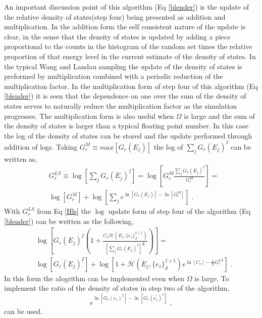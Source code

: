 \documentclass[aps,prl,reprint,superscriptaddress,showkeys]{revtex4-1}
\begin{document}
An important discussion point of this algorithm (Eq \ref{blender}) is the update of the relative density of states(step four) being presented as addition and multiplication. In the addition form the self consistent nature of the update is clear, in the sense that the  density of states is updated by adding a  piece proportional to the counts in the histogram of the random set times the relative proportion of  that energy level in the current estimate of the density of states.  In the typical Wang and Landau sampling the update of the density of states is preformed by multiplication combined with a periodic reduction of the multiplication factor. In the multiplication form of step four of this algorithm (Eq \ref{blender}) it is seen that the dependence on one over the sum of the density of states serves to naturally reduce the multiplication factor as the simulation progresses. The multiplication form is also useful when $\Omega$ is large and the sum of the density of states is larger than a typical floating point number. In this case the log of the density of states can be stored and the update performed through addition of logs. Taking $G_{r}^M \equiv  max[G_{r}(E_j)]$ the log of $\sum_j G_r(E_j)^{I}$ can be written as, 
\begin{equation}
\begin{split}
&G_{r}^{LS} \equiv \log[\sum_j G_{r}(E_j)^{I}] = \log[G_{r}^M \frac{\sum_j G_{r}(E_j)^{I}}{G_{r}^M}]=\\
&\log[G_{r}^M] + \log[\sum_j e^{\ln[G_{r}(E_j)] - \ln[G_{r}^M]} ] \;.
\end{split}
\label{Hls}
\end{equation} 
With $G_r^{LS}$ from Eq \ref{Hls} the $\log$ update form of step four of the algorithm (Eq \ref{blender}) can be written as the following, 
\begin{equation}
\begin{split}
& \log[ G_{r}(E_j)^{I}( 1 +  \frac{C_o \mathcal{H}(E_j,\{e_s\}_{\mathcal{S}}^{I+1}) }{ [\sum_j G_{r}(E_j)^{I}]^{\frac{1}{N} } } ) ]=\\
& \log[ G_{r}(E_j)^{I} ] + \log[1 +   \mathcal{H}(E_j,\{e_s\}_{\mathcal{S}}^{I+1})e^{\ln[C_o]-\frac{1}{N}G_{r}^{LS}}] \;.
\end{split}
\end{equation}
In this form  the alogrithm can be implemented even when $\Omega$ is large. To implement the ratio of the density of states in step two of the algorithm, 
\begin{equation}
e^{\ln[G_{r}(e_s)^{I}] - \ln[G_{r}(e_s^{'})^{I}]} \;,
\end{equation}
can be used.
\end{document}
